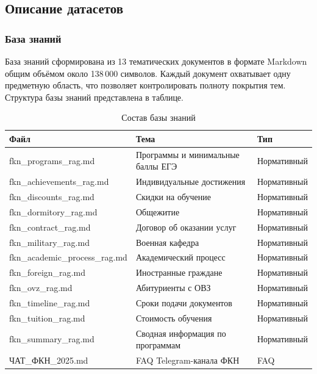 \documentclass{article}
\begin{document}
\subsection{Описание датасетов}

\subsubsection{База знаний}

База знаний сформирована из 13 тематических документов в формате Markdown
общим объёмом около 138\,000 символов. Каждый документ охватывает одну
предметную область, что позволяет контролировать полноту покрытия тем.
Структура базы знаний представлена в таблице.

\begin{table}[h]
\centering
\begin{tabular}{lll}
\hline
\textbf{Файл} & \textbf{Тема} & \textbf{Тип} \\
\hline
fkn\_programs\_rag.md       & Программы и минимальные баллы ЕГЭ & Нормативный \\
fkn\_achievements\_rag.md   & Индивидуальные достижения          & Нормативный \\
fkn\_discounts\_rag.md      & Скидки на обучение                 & Нормативный \\
fkn\_dormitory\_rag.md      & Общежитие                          & Нормативный \\
fkn\_contract\_rag.md       & Договор об оказании услуг          & Нормативный \\
fkn\_military\_rag.md       & Военная кафедра                    & Нормативный \\
fkn\_academic\_process\_rag.md & Академический процесс           & Нормативный \\
fkn\_foreign\_rag.md        & Иностранные граждане               & Нормативный \\
fkn\_ovz\_rag.md            & Абитуриенты с ОВЗ                  & Нормативный \\
fkn\_timeline\_rag.md       & Сроки подачи документов            & Нормативный \\
fkn\_tuition\_rag.md        & Стоимость обучения                 & Нормативный \\
fkn\_summary\_rag.md        & Сводная информация по программам   & Нормативный \\
ЧАТ\_ФКН\_2025.md           & FAQ Telegram-канала ФКН            & FAQ \\
\hline
\end{tabular}
\caption{Состав базы знаний}
\label{tab:knowledge_base}
\end{table}
\end{document}
